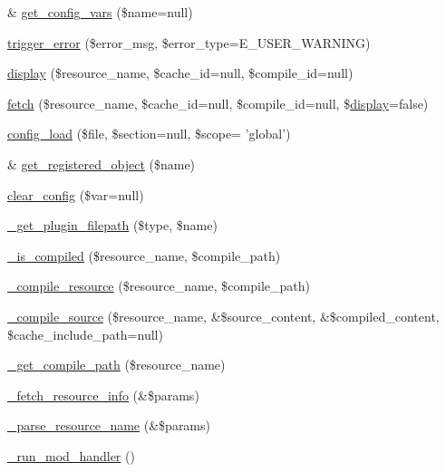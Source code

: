 \begin{DoxyCompactItemize}
\item 
\& \hyperlink{class_smarty_a2382294d36d8e557c475d66350844bfb}{get\-\_\-config\-\_\-vars} (\$name=null)
\item 
\hyperlink{class_smarty_aa4f8246510406271300bee84f9e1bce3}{trigger\-\_\-error} (\$error\-\_\-msg, \$error\-\_\-type=\-E\-\_\-\-U\-S\-E\-R\-\_\-\-W\-A\-R\-N\-I\-N\-G)
\item 
\hyperlink{class_smarty_a7318c22504478672906d321cba2bd713}{display} (\$resource\-\_\-name, \$cache\-\_\-id=null, \$compile\-\_\-id=null)
\item 
\hyperlink{class_smarty_acd45e8177ae9f297026ee9a0732e976c}{fetch} (\$resource\-\_\-name, \$cache\-\_\-id=null, \$compile\-\_\-id=null, \$\hyperlink{class_smarty_a7318c22504478672906d321cba2bd713}{display}=false)
\item 
\hyperlink{class_smarty_ad7beb1fcf478744bfcb4892884559c79}{config\-\_\-load} (\$file, \$section=null, \$scope= 'global')
\item 
\& \hyperlink{class_smarty_ae922fb129fc263df7c3f4b83880b199d}{get\-\_\-registered\-\_\-object} (\$name)
\item 
\hyperlink{class_smarty_a889e401c09b8d2612e43a50cb2a7dc04}{clear\-\_\-config} (\$var=null)
\item 
\hyperlink{class_smarty_aca3dac6a8fa20f5038e34af0c7f1c78b}{\-\_\-get\-\_\-plugin\-\_\-filepath} (\$type, \$name)
\item 
\hyperlink{class_smarty_a315bf9a64ca2baea77f8868804d847be}{\-\_\-is\-\_\-compiled} (\$resource\-\_\-name, \$compile\-\_\-path)
\item 
\hyperlink{class_smarty_af0c22913faf4ec5e6d8674c643c69cc5}{\-\_\-compile\-\_\-resource} (\$resource\-\_\-name, \$compile\-\_\-path)
\item 
\hyperlink{class_smarty_a9df9b14069c359f1f45416acc6d7d81f}{\-\_\-compile\-\_\-source} (\$resource\-\_\-name, \&\$source\-\_\-content, \&\$compiled\-\_\-content, \$cache\-\_\-include\-\_\-path=null)
\item 
\hyperlink{class_smarty_a8a89232edb42318063b90fee5f608ec0}{\-\_\-get\-\_\-compile\-\_\-path} (\$resource\-\_\-name)
\item 
\hyperlink{class_smarty_a0c3ac497dbe0e595d4f2a85f1168a219}{\-\_\-fetch\-\_\-resource\-\_\-info} (\&\$params)
\item 
\hyperlink{class_smarty_a3fd3782e935db8cbac33da3d735df988}{\-\_\-parse\-\_\-resource\-\_\-name} (\&\$params)
\item 
\hyperlink{class_smarty_aadef62274bb4693faadaa1bfbfddae6f}{\-\_\-run\-\_\-mod\-\_\-handler} ()

\end{DoxyCompactItemize}
